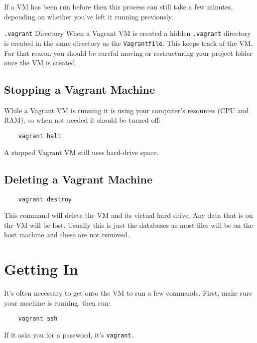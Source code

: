 If a VM has been run before then this process can still take a few minutes, depending on whether you've left it running previously.

\begin{infobox}{\texttt{.vagrant} Directory}
    When a Vagrant VM is created a hidden \texttt{.vagrant} directory is created in the same directory as the \texttt{Vagrantfile}. This keeps track of the VM.
    \\

    For that reason you should be careful moving or restructuring your project folder once the VM is created.
\end{infobox}


\subsection{Stopping a Vagrant Machine}

While a Vagrant VM is running it is using your computer's resources (CPU and RAM), so when not needed it should be turned off:

\begin{verbatim}
    vagrant halt
\end{verbatim}

A stopped Vagrant VM still uses hard-drive space.

\subsection{Deleting a Vagrant Machine}

\begin{verbatim}
    vagrant destroy
\end{verbatim}

This command will delete the VM and its virtual hard drive. Any data that is on the VM will be lost. Usually this is just the databases as most files will be on the host machine and these are not removed.


\section{Getting In}

It's often necessary to get onto the VM to run a few commands. First, make sure your machine is running, then run:

\begin{verbatim}
    vagrant ssh
\end{verbatim}

If it asks you for a password, it's \texttt{vagrant}.
\\

